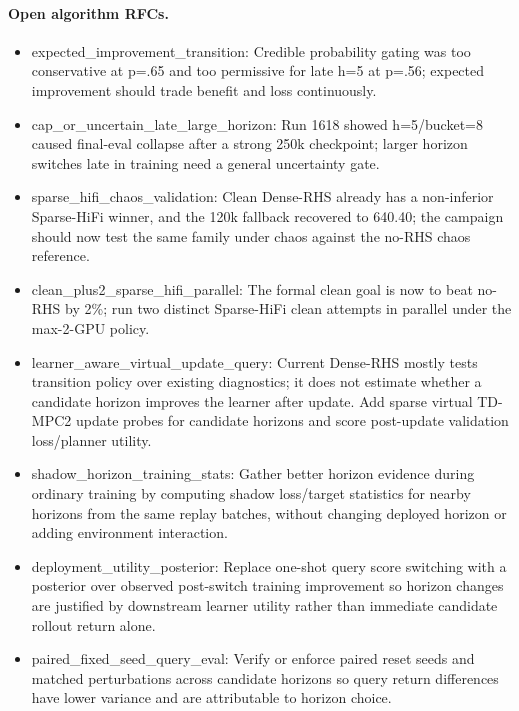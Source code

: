 \paragraph{Open algorithm RFCs.}
\begin{itemize}
\item expected\_improvement\_transition: Credible probability gating was too conservative at p=.65 and too permissive for late h=5 at p=.56; expected improvement should trade benefit and loss continuously.
\item cap\_or\_uncertain\_late\_large\_horizon: Run 1618 showed h=5/bucket=8 caused final-eval collapse after a strong 250k checkpoint; larger horizon switches late in training need a general uncertainty gate.
\item sparse\_hifi\_chaos\_validation: Clean Dense-RHS already has a non-inferior Sparse-HiFi winner, and the 120k fallback recovered to 640.40; the campaign should now test the same family under chaos against the no-RHS chaos reference.
\item clean\_plus2\_sparse\_hifi\_parallel: The formal clean goal is now to beat no-RHS by 2\%; run two distinct Sparse-HiFi clean attempts in parallel under the max-2-GPU policy.
\item learner\_aware\_virtual\_update\_query: Current Dense-RHS mostly tests transition policy over existing diagnostics; it does not estimate whether a candidate horizon improves the learner after update. Add sparse virtual TD-MPC2 update probes for candidate horizons and score post-update validation loss/planner utility.
\item shadow\_horizon\_training\_stats: Gather better horizon evidence during ordinary training by computing shadow loss/target statistics for nearby horizons from the same replay batches, without changing deployed horizon or adding environment interaction.
\item deployment\_utility\_posterior: Replace one-shot query score switching with a posterior over observed post-switch training improvement so horizon changes are justified by downstream learner utility rather than immediate candidate rollout return alone.
\item paired\_fixed\_seed\_query\_eval: Verify or enforce paired reset seeds and matched perturbations across candidate horizons so query return differences have lower variance and are attributable to horizon choice.
\end{itemize}
